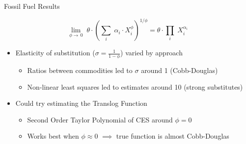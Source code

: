 \documentclass[11pt,aspectratio=169]{beamer}
\begin{document}
\begin{frame}{Fossil Fuel Results}


\vspace{0.5em}

\begin{block}{}
	$$ \lim_{\phi \to \, 0} \; \theta \cdot \left( \sum_i \; \alpha_i \cdot X_i^\phi \right)^{1/\phi} = \theta \cdot  \prod_i \;  X_i^{\alpha_i} $$
\end{block}

\vspace{-0em}

\begin{itemize}
	
	
	\item Elasticity of substitution ($\sigma = \frac{1}{1-\phi}$) varied by approach
	
	\begin{itemize}
		\item Ratios between commodities led to $\sigma$ around 1 (Cobb-Douglas)
		\item Non-linear least squares led to estimates around 10 (strong substitutes)
	\end{itemize}
	
	
	\item Could try estimating the Translog Function
	
	\begin{itemize}
		\item Second Order Taylor Polynomial of CES around $\phi = 0$
		\item Works best when $\phi \approx 0$ $\implies$ true function is almost Cobb-Douglas
	\end{itemize}
	
	
\end{itemize}


\end{frame}
\end{document}

